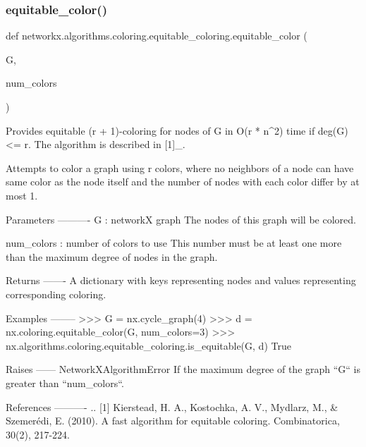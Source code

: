 \subsubsection{\texorpdfstring{equitable\+\_\+color()}{equitable\_color()}}
{\footnotesize\ttfamily def networkx.\+algorithms.\+coloring.\+equitable\+\_\+coloring.\+equitable\+\_\+color (\begin{DoxyParamCaption}\item[{}]{G,  }\item[{}]{num\+\_\+colors }\end{DoxyParamCaption})}

\begin{DoxyVerb}Provides equitable (r + 1)-coloring for nodes of G in O(r * n^2) time
if deg(G) <= r. The algorithm is described in [1]_.

Attempts to color a graph using r colors, where no neighbors of a node
can have same color as the node itself and the number of nodes with each
color differ by at most 1.

Parameters
----------
G : networkX graph
   The nodes of this graph will be colored.

num_colors : number of colors to use
   This number must be at least one more than the maximum degree of nodes
   in the graph.

Returns
-------
A dictionary with keys representing nodes and values representing
corresponding coloring.

Examples
--------
>>> G = nx.cycle_graph(4)
>>> d = nx.coloring.equitable_color(G, num_colors=3)
>>> nx.algorithms.coloring.equitable_coloring.is_equitable(G, d)
True

Raises
------
NetworkXAlgorithmError
    If the maximum degree of the graph ``G`` is greater than
    ``num_colors``.

References
----------
.. [1] Kierstead, H. A., Kostochka, A. V., Mydlarz, M., & Szemerédi, E.
    (2010). A fast algorithm for equitable coloring. Combinatorica, 30(2),
    217-224.
\end{DoxyVerb}
 \mbox{\label{namespacenetworkx_1_1algorithms_1_1coloring_1_1equitable__coloring_a18b64cc06a3c34def29e3cebdd5ae39b}} 
